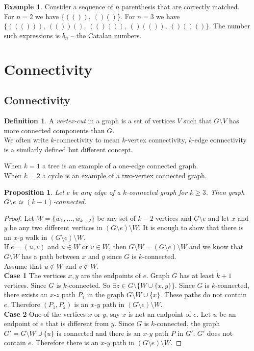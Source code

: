 \documentclass{article}
\newtheorem*{prop}{Proposition}
\theoremstyle{definition}
\newtheorem*{defn}{Definition}
\newtheorem*{ex}{Example}
\begin{document}
\begin{ex}
Consider a sequence of $n$ parenthesis that are correctly matched.
For $n=2$ we have $\{(()),\ ()()\}$.
For $n=3$ we have $\{((())),\ (())(),\ (()()),\ ()(()),\ ()()()\}$.
The number such expressions is $b_n$ -- the Catalan numbers.
\end{ex}

\section{Connectivity}
\subsection{Connectivity}

\begin{defn}
A \emph{vertex-cut} in a graph is a set of vertices $V$ such that $G\setminus V$ has more connected components than $G$. \\
We often write $k$-connectivity to mean $k$-vertex connectivity, $k$-edge connectivity is a similarly defined but different concept.
\end{defn}

When $k=1$ a tree is an example of a one-edge connected graph.\\
When $k=2$ a cycle is an example of a two-vertex connected graph.

\begin{prop}
Let $e$ be any edge of a $k$-connected graph for $k\ge 3$.
Then graph $G\setminus e$ is $(k-1)$-connected.
\end{prop}

\begin{proof}
Let $W=\{w_1,\ldots,w_{k-2}\}$ be any set of $k-2$ vertices and $G\setminus e$ and let $x$ and $y$ be any two different vertices in $(G\setminus e)\setminus W$.
It is enough to show that there is an $x$-$y$ walk in $(G\setminus e)\setminus W$. \\
If $e=(u,v)$ and $u\in W$ or $v\in W$, then $G\setminus W = (G\setminus e) \setminus W$ and we know that $G\setminus W$ has a path between $x$ and $y$ since $G$ is $k$-connected. \\
Assume that $u\not\in W$ and $v\not\in W$. \\
\textbf{Case 1} The vertices $x,y$ are the endpoints of $e$.
Graph $G$ has at least $k+1$ vertices.
Since $G$ is $k$-connected. 
So $\exists z\in G\setminus\{W\cup\{x,y\}\}$.
Since $G$ is $k$-connected, there exists an $x$-$z$ path $P_1$ in the graph $G\setminus W\cup\{x\}$.
These paths do not contain $e$.
Therefore $(P_1,P_2)$ is an $x$-$y$ path in $(G\setminus e)\setminus W$. \\
\textbf{Case 2} One of the vertices $x$ or $y$, say $x$ is not an endpoint of $e$.
Let $u$ be an endpoint of $e$ that is different from $y$.
Since $G$ is $k$-connected, the graph $G' = G\setminus W\cup\{u\}$ is connected and there is an $x$-$y$ path $P$ in $G'$.
$G'$ does not contain $e$.
Therefore there is an $x$-$y$ path in $(G\setminus e)\setminus W$.
\end{proof}
\end{document}
